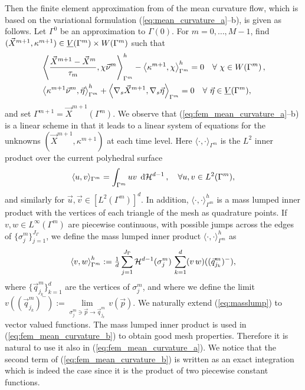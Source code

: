 Then the finite element approximation from \cite{triplejMC,gflows3d} of the
mean curvature flow, which is based on the variational formulation
(\ref{eq:mean_curvature_a}--b), is given as follows. Let $\Gamma^0$ be an
approximation to $\Gamma(0)$. For $m=0,\ldots,M-1$, find $(\vec{X}^{m+1},
\kappa^{m+1}) \in \underline{V}(\Gamma^m) \times W(\Gamma^m)$ such that
\begin{subequations}
\begin{align}
&\left\langle \frac{\vec{X}^{m + 1} - \vec{X}^{m}}{\tau_m},
\chi\vec{\nu}^m\right\rangle_{\Gamma^m}^h - \left\langle\kappa^{m+1}, \chi
\right\rangle_{\Gamma^m}^h=0\quad \forall\ \chi \in
W(\Gamma^m)\,,\label{eq:fem_mean_curvature_a}\\
&\left\langle\kappa^{m+1}\vec{\nu}^m, \vec{\eta}\right\rangle_{\Gamma^m}^{h} +
\left\langle\nabla_s\vec{X}^{m + 1},
\nabla_s\vec{\eta}\right\rangle_{\Gamma^m}=0\quad \forall\ \vec\eta \in \underline{V}(\Gamma^m),
\label{eq:fem_mean_curvature_b}
\end{align}
\end{subequations}
and set $\Gamma^{m+1} = \vec{X}^{m+1}(\Gamma^m)$. We observe that
(\ref{eq:fem_mean_curvature_a}--b) is a linear scheme in that it leads to a
linear system of equations for the unknowns $(\vec{X}^{m+1}, \kappa^{m+1})$ at
each time level. Here $\langle\cdot,\cdot\rangle_{\Gamma^m}$ is the $L^2$ inner
product over the current polyhedral surface
\begin{equation}
\langle u,v\rangle_{\Gamma^m} =
\int_{\Gamma^m}uv\,\;{\rm d}{\cal H}^{d-1}\,, \quad\forall u,v \in
L^2(\Gamma^m),
\end{equation}
and similarly for $\vec{u},\vec{v}\in [L^2(\Gamma^m)]^d$. In addition,
$\langle \cdot,\cdot\rangle_{\Gamma^m}^h$ is a mass lumped inner product with
the vertices of each triangle of the mesh as quadrature points. If $v,w \in
L^\infty(\Gamma^m)$ are piecewise continuous, with possible jumps
across the edges of $\{\sigma_j^m\}_{j=1}^{J_\Gamma}$, we define the mass
lumped inner product $\langle\cdot,\cdot\rangle_{\Gamma^m}^h$ as
\begin{equation} \label{eq:masslump}
\left\langle v, w \right\rangle^h_{\Gamma^m} :=
\tfrac1d \sum_{j=1}^{J_\Gamma} \mathcal{H}^{d-1}(\sigma^m_j)\,
\sum_{k=1}^{d} (v\,w)((\vec{q}^m_{j_k})^-),
\end{equation}
where $\{\vec{q}^m_{j_k}\}_{k=1}^{d}$ are the vertices of $\sigma^m_j$, and
where we define the limit $v((\vec{q}^m_{j_k})^-)
:= \underset{\sigma^m_j\ni \vec{p}\to \vec{q}^m_{j_k}}{\lim}\, v(\vec{p})$. We
naturally extend (\ref{eq:masslump}) to vector valued functions. The mass
lumped inner product is used in (\ref{eq:fem_mean_curvature_b}) to obtain good
mesh properties. Therefore it is natural to use it also in
(\ref{eq:fem_mean_curvature_a}). We notice that the second term of
(\ref{eq:fem_mean_curvature_b}) is written as an exact integration which is
indeed the case since it is the product of two piecewise constant functions.

